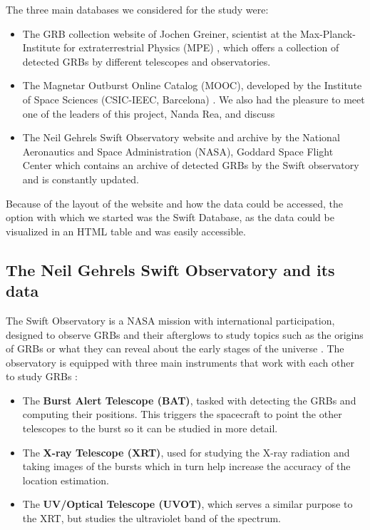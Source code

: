 The three main databases we considered for the study were:

\begin{itemize}
	\item The GRB collection website of Jochen Greiner, scientist at the Max-Planck-Institute for extraterrestrial Physics (MPE) \cite{greinergrb},  which offers a collection of detected GRBs by different telescopes and observatories.
	\item The Magnetar Outburst Online Catalog (MOOC), developed by the Institute of Space Sciences (CSIC-IEEC, Barcelona) \cite{moocgrbs}. We also had the pleasure to meet one of the leaders of this project, Nanda Rea, and discuss
	\item The Neil Gehrels Swift Observatory website and archive by the National Aeronautics and Space Administration (NASA), Goddard Space Flight Center \cite{swiftnasa} which contains an archive of detected GRBs by the Swift observatory and is constantly updated.
\end{itemize}

Because of the layout of the website and how the data could be accessed, the option with which we started was the Swift Database, as the data could be visualized in an HTML table and was easily accessible.

\subsection{The Neil Gehrels Swift Observatory and its data}

The Swift Observatory is a NASA mission with international participation, designed to observe GRBs and their afterglows to study topics such as the origins of GRBs or what they can reveal about the early stages of the universe \cite{roming2005swift}. The observatory is equipped with three main instruments that work with each other to study GRBs \cite{gehrels2004swift} \cite{swiftnasa}:

\begin{itemize}
	\item The \textbf{Burst Alert Telescope (BAT)}, tasked with detecting the GRBs and computing their positions. This triggers the spacecraft to point the other telescopes to the burst so it can be studied in more detail. 
	\item The \textbf{X-ray Telescope (XRT)}, used for studying the X-ray radiation and taking images of the bursts which in turn help increase the accuracy of the location estimation.
	\item The \textbf{UV/Optical Telescope (UVOT)}, which serves a similar purpose to the XRT, but studies the ultraviolet band of the spectrum. 
\end{itemize}

